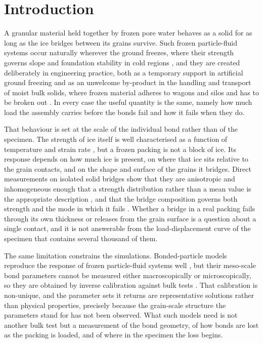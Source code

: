 \documentclass[preprint,12pt,numbers]{elsarticle}
\begin{document}
  \section{Introduction}
  \label{sec:introduction}
  A granular material held together by frozen pore water behaves as a solid for
  as long as the ice bridges between its grains survive.  Such frozen
  particle-fluid systems occur naturally wherever the ground freezes, where
  their strength governs slope and foundation stability in cold regions
  \cite{andersland2004frozen, arenson2007rheology}, and they are created
  deliberately in engineering practice, both as a temporary support in
  artificial ground freezing \cite{schindler2023artificial} and as an
  unwelcome by-product in the handling and transport of moist bulk solids,
  where frozen material adheres to wagons and silos and has to be broken out
  \cite{mo2025frozencoal}.  In every case the useful
  quantity is the same, namely how much load the assembly carries before the
  bonds fail and how it fails when they do.

  That behaviour is set at the scale of the individual bond rather than of the
  specimen.  The strength of ice itself is well characterised as a function of
  temperature and strain rate \cite{baker2024freshwaterice, jia2025icerock},
  but a frozen packing is not a block of ice.  Its response depends on how much
  ice is present, on where that ice sits relative to the grain contacts, and on
  the shape and surface of the grains it bridges.  Direct measurements on
  isolated solid bridges show that they are anisotropic and inhomogeneous
  enough that a strength distribution rather than a mean value is the
  appropriate description \cite{Kirsch2011}, and that the bridge composition
  governs both strength and the mode in which it fails \cite{Farber2003}.
  Whether a bridge in a real packing fails through its own thickness or
  releases from the grain surface is a question about a single contact, and it
  is not answerable from the load-displacement curve of the specimen that
  contains several thousand of them.

  The same limitation constrains the simulations.  Bonded-particle models
  reproduce the response of frozen particle-fluid systems well
  \cite{Chan2022}, but their meso-scale bond parameters cannot be measured
  either macroscopically or microscopically, so they are obtained by inverse
  calibration against bulk tests
  \cite{Khosrozadeh2026inverse}.  That calibration is
  non-unique, and the parameter sets it returns are representative solutions
  rather than physical properties, precisely because the grain-scale structure
  the parameters stand for has not been observed.  What such models need is not
  another bulk test but a measurement of the bond geometry, of how bonds are
  lost as the packing is loaded, and of where in the specimen the loss begins.
\end{document}
